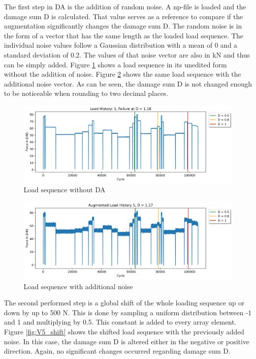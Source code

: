 The first step in DA is the addition of random noise. A np-file is loaded and the damage sum D is calculated. That value serves as a reference to compare if the augmentation significantly changes the damage sum D.
The random noise is in the form of a vector that has the same length as the loaded load sequence.
The individual noise values follow a Gaussian distribution with a mean of 0 and a standard deviation of 0.2. 
The values of that noise vector are also in kN and thus can be simply added.
Figure \ref{fig:V5} shows a load sequence in its unedited form without the addition of noise. Figure \ref{fig:V5_noise} shows the same load sequence with the additional noise vector. As can be seen, the damage sum D is not changed enough to be noticeable when rounding to two decimal places. 

\begin{figure}[H]
	\centering
	\includegraphics[width=1\linewidth]{IMGs/Verlauf_5.jpg}
	\caption{Load sequence without DA}
	\label{fig:V5}
\end{figure}

\begin{figure}[H]
	\centering
	\includegraphics[width=1\linewidth]{IMGs/Verlauf_5_noise.jpg}
	\caption{Load sequence with additional noise}
	\label{fig:V5_noise}
\end{figure}

The second performed step is a global shift of the whole loading sequence up or down by up to 500 N. This is done by sampling a uniform distribution between -1 and 1 and multiplying by 0.5. This constant is added to every array element. Figure \ref{fig:V5_shift} shows the shifted load sequence with the previously added noise. In this case, the damage sum D is altered either in the negative or positive direction. Again, no significant changes occurred regarding damage sum D.

